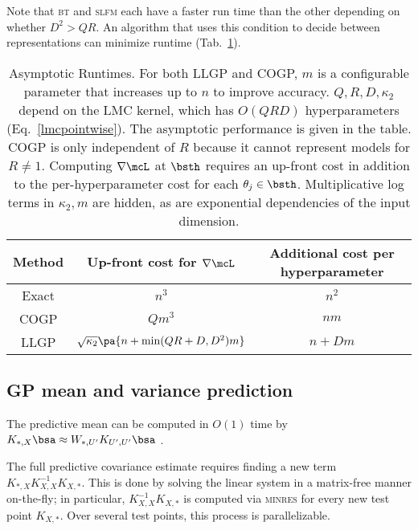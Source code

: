 \documentclass[twoside]{article}
\begin{document}
Note that \textsc{bt} and \textsc{slfm} each have a faster run time than the other depending on whether $D^2>QR$. An algorithm that uses this condition to decide between representations can minimize runtime (Tab.~\ref{asymp}). 

\begin{table*}[!ht]
  \caption{
   Asymptotic Runtimes. For both LLGP and COGP, $m$ is a configurable parameter that increases up to $n$ to improve accuracy. $Q,R,D,\kappa_2$ depend on the LMC kernel, which has $O(QRD)$ hyperparameters (Eq.~\ref{lmcpointwise}). The asymptotic performance is given in the table. COGP is only independent of $R$ because it cannot represent models for $R\neq 1$. Computing $\nabla\mcL$ at $\bsth$ requires an up-front cost in addition to the per-hyperparameter cost for each $\theta_j\in\bsth$. Multiplicative log terms in $\kappa_2, m$ are hidden, as are exponential dependencies of the input dimension.
  }
\label{asymp}
\begin{sc}
\begin{center}
\begin{small}
\begin{tabular}{ccc}
  \toprule
  Method & Up-front cost for $\nabla \mcL$ & Additional cost per hyperparameter\\
  \midrule
  Exact & $n^3$ & $n^2 $\\
  COGP & $Qm^3$ & $nm$ \\
  LLGP & $\sqrt{\kappa_2} \pa{n +\min(QR+D, D^2) m}$ &  $n + D m$ \\
  \bottomrule
\end{tabular}
\end{small}
\end{center}
\end{sc}
\end{table*}

\subsection{GP mean and variance prediction}
    
The predictive mean can be computed in $O(1)$ time by $K_{*,X}\bsa\approx W_{*,{U'}}K_{{U'},{U'}}\bsa$ \citep{msgp}.

The full predictive covariance estimate requires finding a new term $K_{*,X}K_{X,X}^{-1}K_{X,*}$. This is done by solving the linear system in a matrix-free manner on-the-fly; in particular, $K_{X,X}^{-1}K_{X,*}$ is computed via \textsc{minres} for every new test point $K_{X,*}$. Over several test points, this process is parallelizable.
\end{document}
